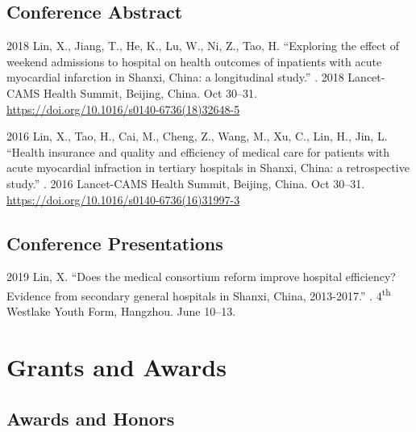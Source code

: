 \documentclass[12pt,letterpaper]{report}
\begin{document}
    \subsection*{Conference Abstract}

    \begin{tablist}
        
        \item[2018] \tab Lin, X., Jiang, T., He, K., Lu, W., Ni, Z., Tao, H. \enquote{Exploring the effect of weekend admissions to hospital on health outcomes of inpatients with acute myocardial infarction in Shanxi, China: a longitudinal study.} . 2018 Lancet-CAMS Health Summit, Beijing, China. Oct 30--31. \href{https://doi.org/10.1016/s0140-6736(18)32648-5}{https://doi.org/10.1016/s0140-6736(18)32648-5}

        
		\item[2016] \tab Lin, X., Tao, H., Cai, M., Cheng, Z., Wang, M., Xu, C., Lin, H., Jin, L. \enquote{Health insurance and quality and efficiency of medical care for patients with acute myocardial infraction in tertiary hospitals in Shanxi, China: a retrospective study.} . 2016 Lancet-CAMS Health Summit, Beijing, China. Oct 30--31.  \href{https://doi.org/10.1016/s0140-6736(16)31997-3}{https://doi.org/10.1016/s0140-6736(16)31997-3 }            
  
    \end{tablist}
    
    
    
    \subsection*{Conference Presentations}
		\begin{tablist}
		
        \item[2019] \tab Lin, X. \enquote{Does the medical consortium reform improve hospital efficiency? Evidence from secondary general hospitals in Shanxi, China, 2013-2017.} . 4\textsuperscript{th} Westlake Youth Form, Hangzhou. June 10--13. 
            
    	\end{tablist}


    \section*{Grants and Awards}

    \subsection*{Awards and Honors}
\end{document}
